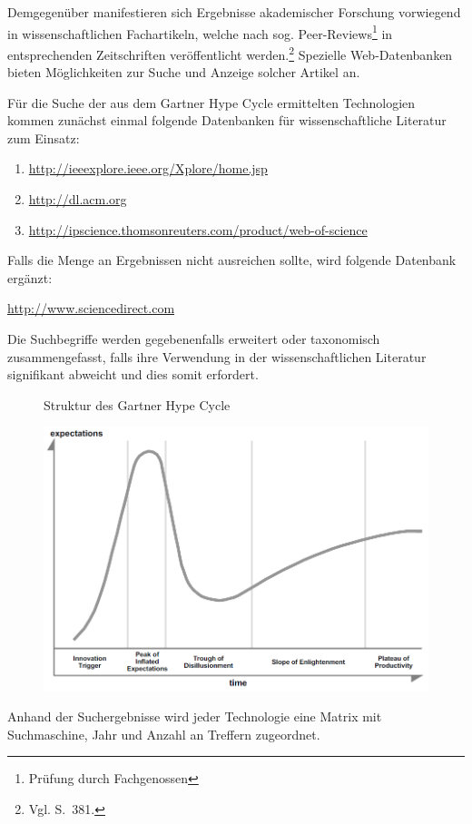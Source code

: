 Demgegenüber manifestieren sich Ergebnisse akademischer Forschung vorwiegend in wissenschaftlichen Fachartikeln, welche nach sog. \glqq Peer-Reviews\grqq \footnote{Prüfung durch Fachgenossen} in entsprechenden Zeitschriften veröffentlicht werden.\footnote{Vgl.  S.~381.} Spezielle Web-Datenbanken bieten Möglichkeiten zur Suche und Anzeige solcher Artikel an.

Für die Suche der aus dem \glqq Gartner Hype Cycle \grqq ermittelten Technologien kommen zunächst einmal folgende Datenbanken für wissenschaftliche Literatur zum Einsatz:
\begin{enumerate}
	\item \url{http://ieeexplore.ieee.org/Xplore/home.jsp}
	\item \url{http://dl.acm.org}
	\item \url{http://ipscience.thomsonreuters.com/product/web-of-science}
\end{enumerate}

Falls die Menge an Ergebnissen nicht ausreichen sollte, wird folgende Datenbank ergänzt:

\url{http://www.sciencedirect.com}

Die Suchbegriffe werden gegebenenfalls erweitert oder taxonomisch zusammengefasst, falls ihre Verwendung in der wissenschaftlichen Literatur signifikant abweicht und dies somit erfordert.

\begin{figure}[h]
	\centering
	\caption{Struktur des \glqq Gartner Hype Cycle\grqq}
	\includegraphics[width=0.9\linewidth]{img/ghc_raw}
	\caption*{\protect\fullciteNP<Quelle:>[S.~4]{Fenn2017}}
	\label{fig:ghc_raw}
\end{figure}

Anhand der Suchergebnisse wird jeder Technologie eine Matrix mit Suchmaschine, Jahr und Anzahl an Treffern zugeordnet. 

